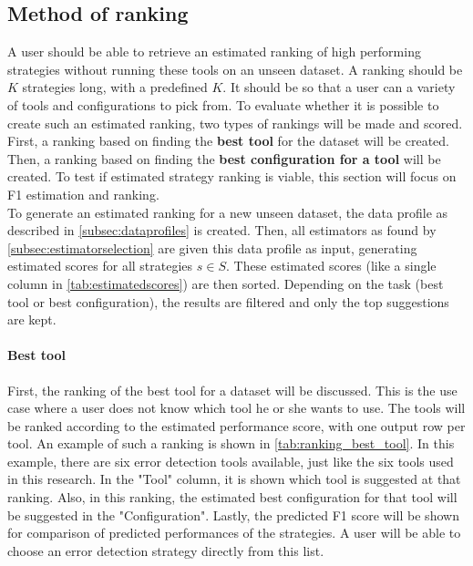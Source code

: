 \subsection{Method of ranking}
A user should be able to retrieve an estimated ranking of high performing strategies without running these tools on an unseen dataset. A ranking should be $K$ strategies long, with a predefined $K$. It should be so that a user can a variety of tools and configurations to pick from. To evaluate whether it is possible to create such an estimated ranking, two types of rankings will be made and scored. First, a ranking based on finding the \textbf{best tool} for the dataset will be created. Then, a ranking based on finding the \textbf{best configuration for a tool} will be created.
To test if estimated strategy ranking is viable, this section will focus on F1 estimation and ranking. 
\\To generate an estimated ranking for a new unseen dataset, the data profile as described in \autoref{subsec:dataprofiles} is created. Then, all estimators as found by \autoref{subsec:estimatorselection} are given this data profile as input, generating estimated scores for all strategies $s \in S$. These estimated scores (like a single column in \autoref{tab:estimatedscores}) are then sorted. Depending on the task (best tool or best configuration), the results are filtered and only the top suggestions are kept.

\paragraph{Best tool} First, the ranking of the best tool for a dataset will be discussed. This is the use case where a user does not know which tool he or she wants to use. The tools will be ranked according to the estimated performance score, with one output row per tool. An example of such a ranking is shown in \autoref{tab:ranking_best_tool}. In this example, there are six error detection tools available, just like the six tools used in this research. In the "Tool" column, it is shown which tool is suggested at that ranking. Also, in this ranking, the estimated best configuration for that tool will be suggested in the "Configuration". Lastly, the predicted F1 score will be shown for comparison of predicted performances of the strategies. A user will be able to choose an error detection strategy directly from this list.

